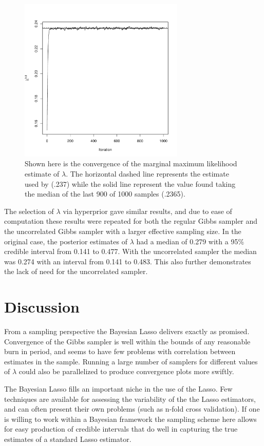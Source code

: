 \documentclass{uwstat572}
\begin{document}
\begin{figure}\label{lambda}
  \centering
    \includegraphics[width=0.7\textwidth]{SaveLambdaConverge.pdf}
  \caption{Shown here is the convergence of the marginal maximum likelihood estimate of $\lambda$. The horizontal dashed line represents the estimate used by \cite{park2008bayesian} (.237) while the solid line represent the value found taking the median of the last 900 of 1000 samples (.2365).}
\end{figure}

The selection of $\lambda$ via hyperprior gave similar results, and due to ease of computation these results were repeated for both the regular Gibbs sampler and the uncorrelated Gibbs sampler with a larger effective sampling size. In the original case, the posterior estimates of $\lambda$ had a median of 0.279 with a 95\% credible interval from 0.141 to 0.477. With the uncorrelated sampler the median was 0.274 with an interval from 0.141 to 0.483. This also further demonstrates the lack of need for the uncorrelated sampler.

\section{Discussion}
From a sampling perspective the Bayesian Lasso delivers exactly as promised. Convergence of the Gibbs sampler is well within the bounds of any reasonable burn in period, and seems to have few problems with correlation between estimates in the sample. Running a large number of samplers for different values of $\lambda$ could also be parallelized to produce convergence plots more swiftly.

The Bayesian Lasso fills an important niche in the use of the Lasso. Few techniques are available for assessing the variability of the the Lasso estimators, and can often present their own problems (such as n-fold cross validation). If one is willing to work within a Bayesian framework the sampling scheme here allows for easy production of credible intervals that do well in capturing the true estimates of a standard Lasso estimator. 
\end{document}

